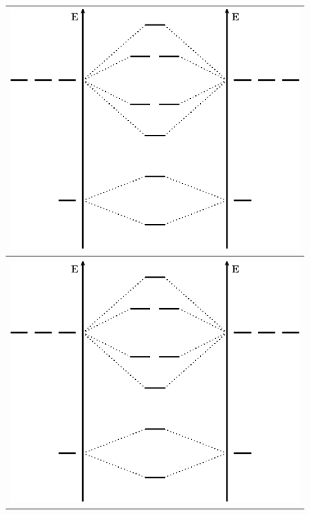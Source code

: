 \clearpage
%
\begin{figure}[!h]
\begin{center}
\begin{tabular}{c}
\includegraphics[height=0.4\textheight]{figure/diagOM.eps}\\[0.25cm]
\hline \\[0.25cm]
\includegraphics[height=0.4\textheight]{figure/diagOM.eps}\\
\end{tabular}
\end{center}
\end{figure}
\clearpage
